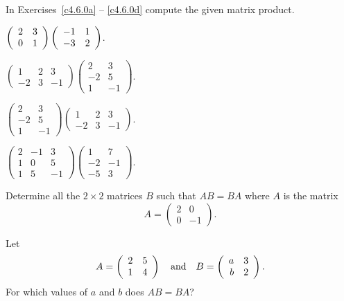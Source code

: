 \noindent In Exercises~\ref{c4.6.0a} -- \ref{c4.6.0d} compute
the given matrix product.
\begin{exercise}  \label{c4.6.0a}
$\left(\begin{array}{rr} 2 & 3\\ 0 &1\end{array}\right)\left(\begin{array}{rr} -1 & 1\\ -3 &2\end{array}\right)$.
\end{exercise}
\begin{exercise}  \label{c4.6.0b}
$\left(\begin{array}{rrr} 1 & 2 & 3\\ -2 & 3 & -1 \end{array}\right)
\left(\begin{array}{rr} 2 & 3\\ -2 & 5 \\1 & -1 \end{array}\right)$.
\end{exercise}
\begin{exercise}  \label{c4.6.0c}
$\left(\begin{array}{rr} 2 & 3\\ -2 & 5 \\1 & -1 \end{array}\right)
\left(\begin{array}{rrr} 1 & 2 & 3\\ -2 & 3 & -1 \end{array}\right)$.
\end{exercise}
\begin{exercise}  \label{c4.6.0d}
$\left(\begin{array}{rrr} 2 & -1 &3\\ 1 & 0 & 5\\1 & 5 & -1\end{array}\right)
\left(\begin{array}{rrr} 1 & 7 \\ -2 & -1 \\ -5 & 3\end{array}\right)$.
\end{exercise}


\begin{exercise} \label{c4.6.1}
Determine all the $2\times 2$ matrices $B$ such that $AB=BA$
where $A$ is the matrix
\[
A=\left(\begin{array}{rr} 2 & 0 \\ 0 & -1 \end{array}\right).
\]
\end{exercise}

\begin{exercise} \label{c4.6.2}
Let
\[
A=\left(\begin{array}{rr} 2 & 5\\ 1 &4\end{array}\right) \quad\mbox{and}\quad B=\left(\begin{array}{rr} a & 3\\ b &2\end{array}\right).
\]
For which values of $a$ and $b$ does $AB=BA$?
\end{exercise}

